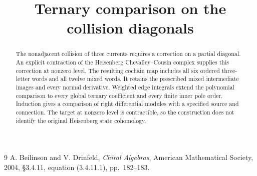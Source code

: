 \documentclass[11pt,oneside]{memoir}
\title{Ternary comparison on the collision diagonals}
\author{}
\date{}
\begin{document}
\maketitle
\begin{abstract}
The nonadjacent collision of three currents requires a correction on a partial diagonal.
An explicit contraction of the Heisenberg Chevalley--Cousin complex supplies this correction at nonzero level.
The resulting cochain map includes all six ordered three-letter words and all twelve mixed words.
It retains the prescribed mixed intermediate images and every normal derivative.
Weighted edge integrals extend the polynomial comparison to every global ternary coefficient and every finite inner pole order.
Induction gives a comparison of right differential modules with a specified source and connection.
The target at nonzero level is contractible, so the construction does not identify the original Heisenberg state cohomology.
\end{abstract}


\begin{thebibliography}{9}
A. Beilinson and V. Drinfeld,
\emph{Chiral Algebras}, American Mathematical Society, 2004,
\S3.4.11, equation (3.4.11.1), pp.~182--183.
\end{thebibliography}
\end{document}
